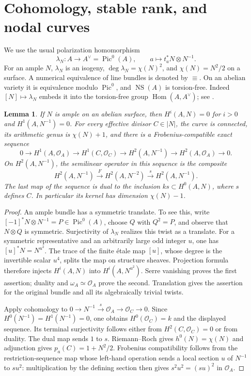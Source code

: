 \documentclass[11pt]{article}
\newtheorem{lemma}[theorem]{Lemma}
\theoremstyle{definition}\newtheorem{definition}[theorem]{Definition}
\theoremstyle{remark}\newtheorem{remark}[theorem]{Remark}
\newcommand{\OO}{\mathcal O}
\newcommand{\Pic}{\operatorname{Pic}}
\newcommand{\NS}{\operatorname{NS}}
\newcommand{\Hom}{\operatorname{Hom}}
\begin{document}
\section{Cohomology, stable rank, and nodal curves}

We use the usual polarization homomorphism
\[
 \lambda_N:A\longrightarrow A^\vee=\Pic^0(A),\qquad
 a\longmapsto t_a^*N\otimes N^{-1}.
\]
For an ample $N$, $\lambda_N$ is an isogeny, $\deg\lambda_N=\chi(N)^2$, and $\chi(N)=N^2/2$ on a surface. A numerical equivalence of line bundles is denoted by $\equiv$. On an abelian variety it is equivalence modulo $\Pic^0$, and $\NS(A)$ is torsion-free. Indeed $[N]\mapsto\lambda_N$ embeds it into the torsion-free group $\Hom(A,A^\vee)$; see \citet[\S7 and Proposition~11.2--Corollary~11.3, pp.~159--160]{EGM}.

\begin{lemma}\label{lem:cohomology}
If $N$ is ample on an abelian surface, then $H^i(A,N)=0$ for $i>0$ and $H^1(A,N^{-1})=0$. For every effective divisor $C\in|N|$, the curve is connected, its arithmetic genus is $\chi(N)+1$, and there is a Frobenius-compatible exact sequence
\begin{equation}\label{eq:relative}
 0\longrightarrow H^1(A,\OO_A)\longrightarrow H^1(C,\OO_C)
 \longrightarrow H^2(A,N^{-1})\longrightarrow H^2(A,\OO_A)
 \longrightarrow0.
\end{equation}
On $H^2(A,N^{-1})$, the semilinear operator in this sequence is the composite
\[
 H^2(A,N^{-1})\xrightarrow{F}H^2(A,N^{-2})\xrightarrow{\,s\,}H^2(A,N^{-1}).
\]
The last map of the sequence is dual to the inclusion $k s\subset H^0(A,N)$, where $s$ defines $C$. In particular its kernel has dimension $\chi(N)-1$.
\end{lemma}
\begin{proof}
An ample bundle has a symmetric translate. To see this, write $[-1]^*N\otimes N^{-1}=P\in\Pic^0(A)$, choose $Q$ with $Q^2=P$, and observe that $N\otimes Q$ is symmetric. Surjectivity of $\lambda_N$ realizes this twist as a translate. For a symmetric representative and an arbitrarily large odd integer $u$, one has $[u]^*N=N^{u^2}$. The trace of the finite \'etale map $[u]$, whose degree is the invertible scalar $u^4$, splits the map on structure sheaves. Projection formula therefore injects $H^i(A,N)$ into $H^i(A,N^{u^2})$. Serre vanishing proves the first assertion; duality and $\omega_A\simeq\OO_A$ prove the second. Translation gives the assertion for the original bundle and all its algebraically trivial twists.

Apply cohomology to $0\to N^{-1}\xrightarrow{s}\OO_A\to\OO_C\to0$. Since $H^0(N^{-1})=H^1(N^{-1})=0$, one obtains $H^0(\OO_C)=k$ and the displayed sequence. Its terminal surjectivity follows either from $H^2(C,\OO_C)=0$ or from duality. The dual map sends $1$ to $s$. Riemann--Roch gives $h^0(N)=\chi(N)$ and adjunction gives $p_a(C)=1+N^2/2$. Frobenius compatibility follows from the restriction-sequence map whose left-hand operation sends a local section $u$ of $N^{-1}$ to $s u^2$: multiplication by the defining section then gives $s^2u^2=(su)^2$ in $\OO_A$.
\end{proof}
\end{document}

